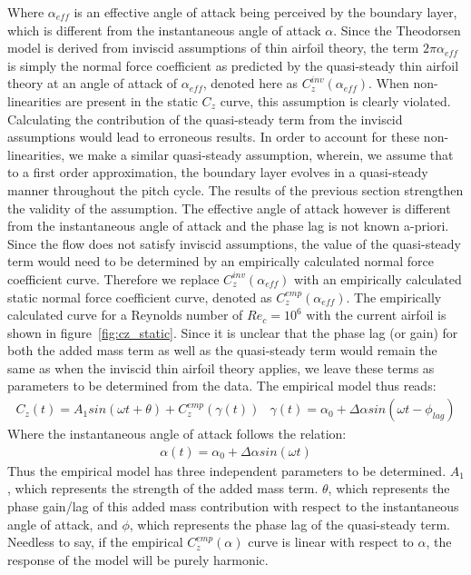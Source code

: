 Where $\alpha_{eff}$ is an effective angle of attack being perceived by the boundary layer, which is different from the instantaneous angle of attack $\alpha$. Since the Theodorsen model is derived from inviscid assumptions of thin airfoil theory, the term $2\pi\alpha_{eff}$ is simply the normal force coefficient as predicted by the quasi-steady thin airfoil theory at an angle of attack of $\alpha_{eff}$, denoted here as $C_{z}^{inv}(\alpha_{eff})$. When non-linearities are present in the static $C_{z}$ curve, this assumption is clearly violated. Calculating the contribution of the quasi-steady term from the inviscid assumptions would lead to erroneous results. In order to account for these non-linearities, we make a similar quasi-steady assumption, wherein, we assume that to a first order approximation, the boundary layer evolves in a quasi-steady manner throughout the pitch cycle. The results of the previous section strengthen the validity of the assumption. The effective angle of attack however is different from the instantaneous angle of attack and the phase lag is not known a-priori. Since the flow does not satisfy inviscid assumptions, the value of the quasi-steady term would need to be determined by an empirically calculated normal force coefficient curve. Therefore we replace $C^{inv}_{z}(\alpha_{eff})$ with an empirically calculated static normal force coefficient curve, denoted as $C^{emp}_{z}(\alpha_{eff})$. The empirically calculated curve for a Reynolds number of $Re_{c}=10^{6}$ with the current airfoil is shown in figure~\ref{fig:cz_static}. Since it is unclear that the phase lag (or gain) for both the added mass term as well as the quasi-steady term would remain the same as when the inviscid thin airfoil theory applies, we leave these terms as parameters to be determined from the data. The empirical model thus reads:
\begin{subequations}
	\begin{align}
		\label{eqn:phase_lag_model}
		C_{z}(t) = A_{1}sin(\omega t + \theta) + C^{emp}_{z}(\gamma(t))
	\end{align}
	\begin{align}
		\label{eqn:effective_alpha}	
		\gamma(t) = \alpha_{0} + \Delta\alpha sin(\omega t - \phi_{lag})
	\end{align}
\end{subequations}
Where the instantaneous angle of attack follows the relation:
\begin{align}
	\alpha(t) = \alpha_{0} + \Delta\alpha sin(\omega t)
\end{align}
Thus the empirical model has three independent parameters to be determined. $A_{1}$, which represents the strength of the added mass term. $\theta$, which represents the phase gain/lag of this added mass contribution with respect to the instantaneous angle of attack, and $\phi$, which represents the phase lag of the quasi-steady term. Needless to say, if the empirical $C^{emp}_{z}(\alpha)$ curve is linear with respect to $\alpha$, the response of the model will be purely harmonic.

